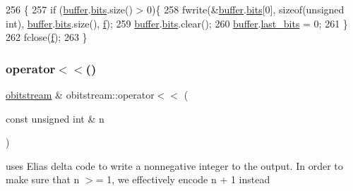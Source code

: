 \begin{DoxyCode}
256                       \{
257   \textcolor{keywordflow}{if} (\hyperlink{classobitstream_aeaccad00a395a404aa16472bfa052be3}{buffer}.\hyperlink{classbit__pipe_a86f38af1e9736b053728033490476b50}{bits}.size() > 0)\{
258     fwrite(&\hyperlink{classobitstream_aeaccad00a395a404aa16472bfa052be3}{buffer}.\hyperlink{classbit__pipe_a86f38af1e9736b053728033490476b50}{bits}[0], \textcolor{keyword}{sizeof}(\textcolor{keywordtype}{unsigned} \textcolor{keywordtype}{int}), \hyperlink{classobitstream_aeaccad00a395a404aa16472bfa052be3}{buffer}.\hyperlink{classbit__pipe_a86f38af1e9736b053728033490476b50}{bits}.size(), 
      \hyperlink{classobitstream_ac589d74745217748c888ae777ab324a7}{f});
259     \hyperlink{classobitstream_aeaccad00a395a404aa16472bfa052be3}{buffer}.\hyperlink{classbit__pipe_a86f38af1e9736b053728033490476b50}{bits}.clear();
260     \hyperlink{classobitstream_aeaccad00a395a404aa16472bfa052be3}{buffer}.\hyperlink{classbit__pipe_a0f3e84b02751803adaab499b5dad86fe}{last\_bits} = 0;
261   \}
262   fclose(\hyperlink{classobitstream_ac589d74745217748c888ae777ab324a7}{f});
263 \}
\end{DoxyCode}
\mbox{\label{classobitstream_a09352e38c7d1d5bcff438c0b8ba41ff4}} 
\subsubsection{\texorpdfstring{operator$<$$<$()}{operator<<()}\hspace{0.1cm}{\footnotesize\ttfamily [1/2]}}
{\footnotesize\ttfamily \hyperlink{classobitstream}{obitstream} \& obitstream\+::operator$<$$<$ (\begin{DoxyParamCaption}\item[{const unsigned int \&}]{n }\end{DoxyParamCaption})}



uses Elias delta code to write a nonnegative integer to the output. In order to make sure that n $>$= 1, we effectively encode n + 1 instead 


